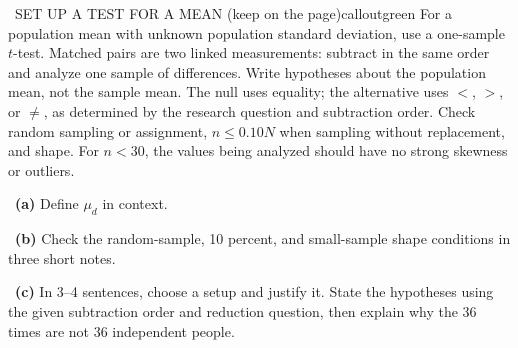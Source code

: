 \documentclass[11pt]{article}
\begin{document}
\begin{callout}{\IconBook\ SET UP A TEST FOR A MEAN (keep on the page)}{calloutgreen}
For a population mean with unknown population standard deviation, use a one-sample $t$-test.
Matched pairs are two linked measurements: subtract in the same order and analyze one sample of differences.
Write hypotheses about the population mean, not the sample mean. The null uses equality; the alternative
uses $<$, $>$, or $\neq$, as determined by the research question and subtraction order.
Check random sampling or assignment, $n\leq0.10N$ when sampling without replacement, and shape.
For $n<30$, the values being analyzed should have no strong skewness or outliers.
\end{callout}

~\textbf{(a)} Define $\mu_d$ in context.\par
{}

~\textbf{(b)} Check the random-sample, 10 percent, and small-sample shape conditions in three short notes.\par
{}

~\textbf{(c)} In 3--4 sentences, choose a setup and justify it. State the hypotheses using the given subtraction order and reduction question, then explain why the 36 times are not 36 independent people.\par
{}
\end{document}
